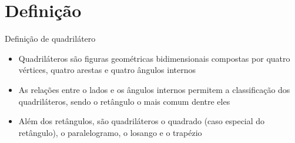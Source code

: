 \section{Definição}

\begin{frame}[fragile]{Definição de quadrilátero}

    \begin{itemize}
        \item Quadriláteros são figuras geométricas bidimensionais compostas por 
            quatro vértices, quatro arestas e quatro ângulos internos
        \pause

        \item As relações entre o lados e os ângulos internos permitem a classificação dos 
            quadriláteros, sendo o retângulo o mais comum dentre eles
        \pause

        \item Além dos retângulos, são quadriláteros o quadrado (caso especial do retângulo),
            o paralelogramo, o losango e o trapézio
    \end{itemize}

\end{frame}
